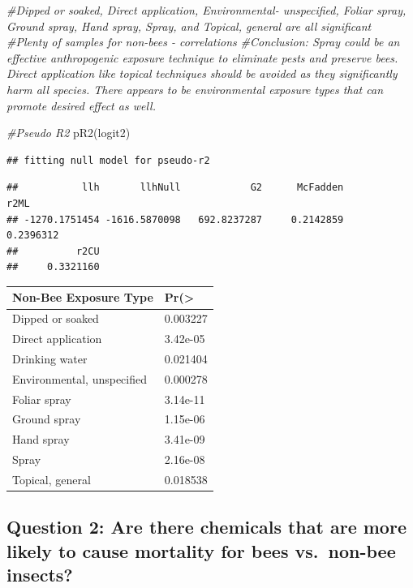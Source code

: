 \documentclass[
  12pt,
]{article}
\newenvironment{Shaded}{\begin{snugshade}}{\end{snugshade}}
\newcommand{\CommentTok}[1]{\textcolor[rgb]{0.56,0.35,0.01}{\textit{#1}}}
\newcommand{\FunctionTok}[1]{\textcolor[rgb]{0.00,0.00,0.00}{#1}}
\newcommand{\NormalTok}[1]{#1}
\begin{document}
\begin{Shaded}
\begin{Highlighting}[]
\CommentTok{\#Dipped or soaked, Direct application, Environmental{-} unspecified, Foliar spray, Ground spray, Hand spray, Spray, and Topical, general are all significant }
\CommentTok{\#Plenty of samples for non{-}bees {-} correlations  }
\CommentTok{\#Conclusion: Spray could be an effective anthropogenic exposure technique to eliminate pests and preserve bees. Direct application like topical techniques should be avoided as they significantly harm all species. There appears to be environmental exposure types that can promote desired effect as well.}

\CommentTok{\#Pseudo R2}
 \FunctionTok{pR2}\NormalTok{(logit2)}
\end{Highlighting}
\end{Shaded}

\begin{verbatim}
## fitting null model for pseudo-r2
\end{verbatim}

\begin{verbatim}
##           llh       llhNull            G2      McFadden          r2ML 
## -1270.1751454 -1616.5870098   692.8237287     0.2142859     0.2396312 
##          r2CU 
##     0.3321160
\end{verbatim}

\begin{longtable}[]{@{}ll@{}}
\toprule
Non-Bee Exposure Type & Pr(\textgreater{} \\
\midrule
\endhead
Dipped or soaked & 0.003227 \\
Direct application & 3.42e-05 \\
Drinking water & 0.021404 \\
Environmental, unspecified & 0.000278 \\
Foliar spray & 3.14e-11 \\
Ground spray & 1.15e-06 \\
Hand spray & 3.41e-09 \\
Spray & 2.16e-08 \\
Topical, general & 0.018538 \\
\bottomrule
\end{longtable}

\hypertarget{question-2-are-there-chemicals-that-are-more-likely-to-cause-mortality-for-bees-vs.-non-bee-insects}{%
\subsection{Question 2: Are there chemicals that are more likely to
cause mortality for bees vs.~non-bee
insects?}\label{question-2-are-there-chemicals-that-are-more-likely-to-cause-mortality-for-bees-vs.-non-bee-insects}}
\end{document}
